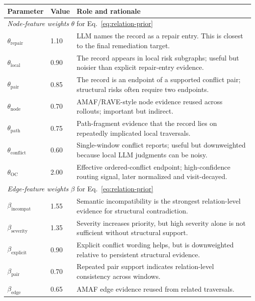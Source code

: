 \documentclass[11pt]{article}
\begin{document}
\begin{table}[t]
\centering
\small
\begin{tabular}{p{}p{}p{}}
\toprule
Parameter & Value & Role and rationale \\
\midrule
\multicolumn{3}{l}{\textit{Node-feature weights }$\theta$ for Eq.~\ref{eq:relation-prior}}\\
$\theta_{\mathrm{repair}}$ & 1.10 & LLM names the record as a repair entry. This is closest to the final remediation target.\\
$\theta_{\mathrm{local}}$ & 0.90 & The record appears in local risk subgraphs; useful but noisier than explicit repair-entry evidence.\\
$\theta_{\mathrm{pair}}$ & 0.85 & The record is an endpoint of a supported conflict pair; structural risks often require two endpoints.\\
$\theta_{\mathrm{node}}$ & 0.70 & AMAF/RAVE-style node evidence reused across rollouts; important but indirect.\\
$\theta_{\mathrm{path}}$ & 0.75 & Path-fragment evidence that the record lies on repeatedly implicated local traversals.\\
$\theta_{\mathrm{conflict}}$ & 0.60 & Single-window conflict reports; useful but downweighted because local LLM judgments can be noisy.\\
$\theta_{\mathrm{OC}}$ & 2.00 & Effective ordered-conflict endpoint; high-confidence routing signal, later normalized and visit-decayed.\\
\midrule
\multicolumn{3}{l}{\textit{Edge-feature weights }$\beta$ for Eq.~\ref{eq:relation-prior}}\\
$\beta_{\mathrm{incompat}}$ & 1.55 & Semantic incompatibility is the strongest relation-level evidence for structural contradiction.\\
$\beta_{\mathrm{severity}}$ & 1.35 & Severity increases priority, but high severity alone is not sufficient without structural support.\\
$\beta_{\mathrm{explicit}}$ & 0.90 & Explicit conflict wording helps, but is downweighted relative to persistent structural evidence.\\
$\beta_{\mathrm{pair}}$ & 0.70 & Repeated pair support indicates relation-level consistency across windows.\\
$\beta_{\mathrm{edge}}$ & 0.65 & AMAF edge evidence reused from related traversals.\\

\end{tabular}
\end{table}
\end{document}
